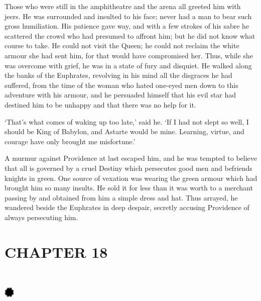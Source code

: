 \documentclass{article}
\begin{document}
\begin{center}
Those who were still in the amphitheatre and the arena all greeted him with jeers. 
He was surrounded and insulted to his face; never had a man to bear such gross 
humiliation. His patience gave way, and with a few strokes of his sabre he scattered 
the crowd who had presumed to affront him; but he did not know what course to take. 
He could not visit the Queen; he could not reclaim the white armour she had sent 
him, for that would have compromised her. Thus, while she was overcome with grief, 
he was in a state of fury and disquiet. He walked along the banks of the Euphrates, 
revolving in his mind all the disgraces he had suffered, from the time of the woman 
who hated one-eyed men down to this adventure with his armour, and he persuaded 
himself that his evil star had destined him to be unhappy and that there was no 
help for it. 

`That's what comes of waking up too late,' said he. `If I had not slept so well, 
I should be King of Babylon, and Astarte would be mine. Learning, virtue, and courage 
have only brought me misfortune.' 

A murmur against Providence at last escaped him, and he was tempted to believe 
that all is governed by a cruel Destiny which persecutes good men and befriends 
knights in green. One source of vexation was wearing the green armour which had 
brought him so many insults. He sold it for less than it was worth to a merchant 
passing by and obtained from him a simple dress and hat. Thus arrayed, he wandered 
beside the Euphrates in deep despair, secretly accusing Providence of always persecuting 
him.\pagebreak{} 

\section*{\textbf{CHAPTER 18 }}

\section*{%
\includegraphics[width=14pt, height=15pt, keepaspectratio=true]{Zadig or L'Ingenu - Voltaire-fig021.jpg}
}

 


\end{center}
\end{document}
